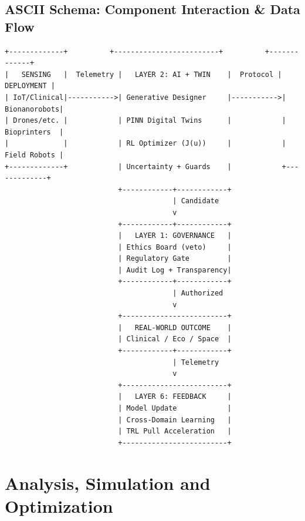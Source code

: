 \documentclass[11pt,a4paper]{report}
\begin{document}
\section{ASCII Schema: Component Interaction \& Data Flow}

\begin{lstlisting}[style=asciistyle, caption={URTE Component Interaction and Closed-Loop Data Flow}]
+-------------+          +-------------------------+          +-------------+
|   SENSING   |  Telemetry |   LAYER 2: AI + TWIN    |  Protocol |  DEPLOYMENT |
| IoT/Clinical|----------->| Generative Designer     |----------->| Bionanorobots|
| Drones/etc. |            | PINN Digital Twins      |            | Bioprinters  |
|             |            | RL Optimizer (J(u))     |            | Field Robots |
+-------------+            | Uncertainty + Guards    |            +-------------+
                           +------------+------------+
                                        | Candidate
                                        v
                           +------------+------------+
                           |   LAYER 1: GOVERNANCE   |
                           | Ethics Board (veto)     |
                           | Regulatory Gate         |
                           | Audit Log + Transparency|
                           +------------+------------+
                                        | Authorized
                                        v
                           +-------------------------+
                           |   REAL-WORLD OUTCOME    |
                           | Clinical / Eco / Space  |
                           +------------+------------+
                                        | Telemetry
                                        v
                           +-------------------------+
                           |   LAYER 6: FEEDBACK     |
                           | Model Update            |
                           | Cross-Domain Learning   |
                           | TRL Pull Acceleration   |
                           +-------------------------+
\end{lstlisting}

\chapter{Analysis, Simulation and Optimization}
\end{document}
